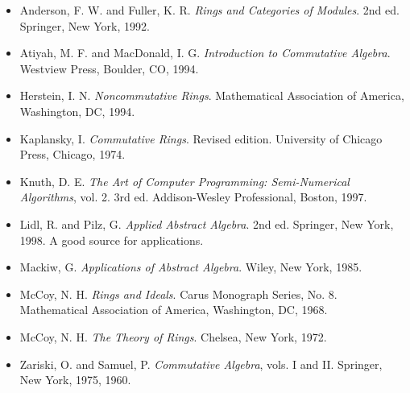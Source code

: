 {\small
\begin{itemize}
 
\item[{\bf [1]}] %
Anderson, F. W. and Fuller, K. R. {\it Rings and Categories of
Modules}. 2nd ed.  Springer, New York, 1992.
 
\item[{\bf [2]}] %
Atiyah, M. F.  and MacDonald, I. G. {\it Introduction to
Commutative Algebra}. Westview Press, Boulder, CO, 1994.
 
\item[{\bf [3]}] %
Herstein, I. N. {\it Noncommutative Rings}. Mathematical Association of America,
Washington, DC, 1994.
 
 
\item[{\bf [4]}] %
Kaplansky, I. {\it Commutative Rings}. Revised edition.
University of Chicago Press, Chicago, 1974.
 
 
\item[{\bf [5]}] %
Knuth, D. E. {\it The Art of Computer Programming: Semi-Numerical
Algorithms}, vol. 2. 3rd ed. Addison-Wesley Professional, Boston, 1997. 
 
 
\item[{\bf [6]}] %
Lidl, R. and Pilz, G. 
{\it Applied Abstract Algebra}. 2nd ed. Springer,
New York, 1998. A good source for applications.
 
\item[{\bf [7]}] %
Mackiw, G. {\it Applications of Abstract Algebra}. Wiley,
New York, 1985.
 
 
\item[{\bf [8]}] %
McCoy,  N. H. {\it  Rings and Ideals}. Carus Monograph Series, No. 8.
Mathematical Association of America, Washington, DC, 1968. 
 
\item[{\bf [9]}] %
McCoy,  N. H. {\it  The Theory of Rings}. Chelsea, New York, 1972.
 
\item[{\bf [10]}] %
Zariski, O. and Samuel, P. {\it Commutative Algebra}, vols. I
and II. Springer, New York, 1975, 1960.
 
 
 
\end{itemize}
}
 
 
 
 

